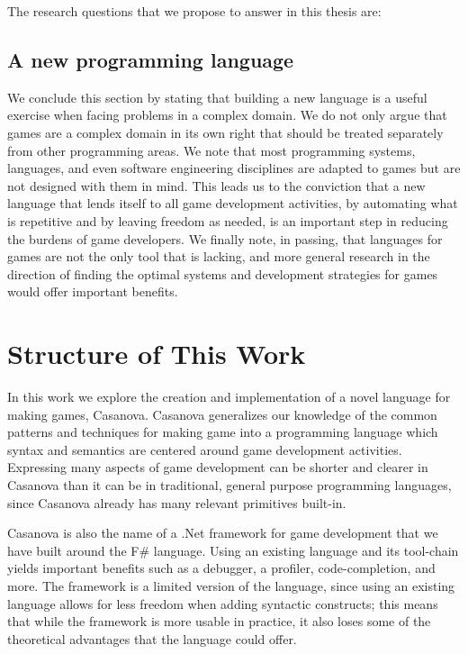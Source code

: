 The research questions that we propose to answer in this thesis are:




\subsection{A new programming language}
We conclude this section by stating that building a new language is a useful exercise when facing problems in a complex domain. We do not only argue that games are a complex domain in its own right that should be treated separately from other programming areas. We note that most programming systems, languages, and even software engineering disciplines are adapted to games but are not designed with them in mind. This leads us to the conviction that a new language that lends itself to all game development activities, by automating what is repetitive and by leaving freedom as needed, is an important step in reducing the burdens of game developers. We finally note, in passing, that languages for games are not the only tool that is lacking, and more general research in the direction of finding the optimal systems and development strategies for games would offer important benefits.


\section{Structure of This Work}
In this work we explore the creation and implementation of a novel language for making games, Casanova. Casanova generalizes our knowledge of the common patterns and techniques for making game into a programming language which syntax and semantics are centered around game development activities. Expressing many aspects of game development can be shorter and clearer in Casanova than it can be in traditional, general purpose programming languages, since Casanova already has many relevant primitives built-in. 

Casanova is also the name of a .Net framework for game development that we have built around the F\# language. Using an existing language and its tool-chain yields important benefits such as a debugger, a profiler, code-completion, and more. The framework is a limited version of the language, since using an existing language allows for less freedom when adding syntactic constructs; this means that while the framework is more usable in practice, it also loses some of the theoretical advantages that the language could offer.

